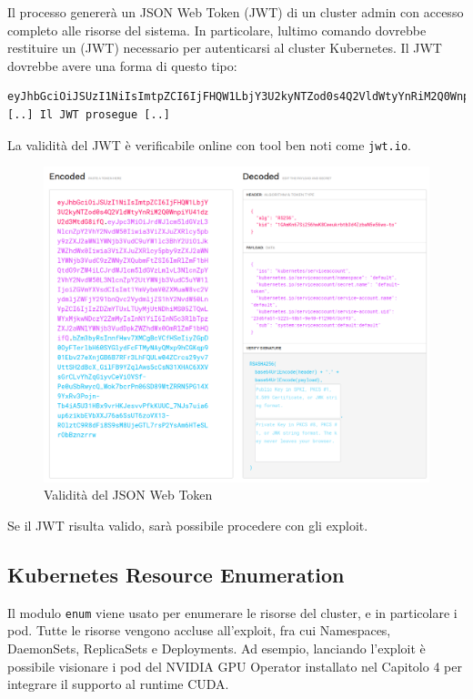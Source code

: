 Il processo genererà un JSON Web Token (JWT) di un cluster admin con accesso completo alle risorse del sistema. In particolare, lultimo comando dovrebbe restituire un (JWT) necessario per autenticarsi al cluster Kubernetes. Il JWT dovrebbe avere una forma di questo tipo:

\begin{code}
\label{code:apx:a:dockerfile}
\begin{verbatim}
eyJhbGciOiJSUzI1NiIsImtpZCI6IjFHQW1LbjY3U2kyNTZod0s4Q2VldWtyYnRiM2Q0Wnpi
[..] Il JWT prosegue [..]
\end{verbatim}
\end{code}

La validità del JWT è verificabile online con tool ben noti come {\small \verb|jwt.io|}.

\begin{figure}[H]
    \centering
    \includegraphics[width=\linewidth]{figures/ch4and5/jwt.png}
    \caption[Validità del JSON Web Token]{Validità del JSON Web Token}
    \label{fig:cha6:jwt}
\end{figure}

Se il JWT risulta valido, sarà possibile procedere con gli exploit.

\subsection{Kubernetes Resource Enumeration}

Il modulo {\small \verb|enum|} viene usato per enumerare le risorse del cluster, e in particolare i pod. Tutte le risorse vengono accluse all'exploit, fra cui Namespaces, DaemonSets, ReplicaSets e Deployments. Ad esempio, lanciando l'exploit è possibile visionare i pod del NVIDIA GPU Operator installato nel Capitolo 4 per integrare il supporto al runtime CUDA.

